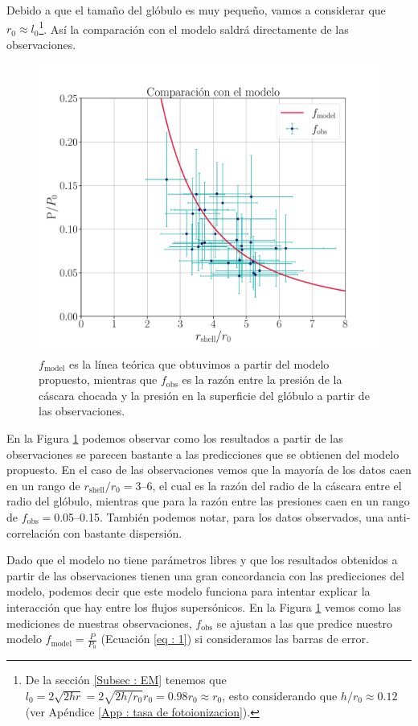 \documentclass{book}
\begin{document}
Debido a que el tamaño del glóbulo es muy pequeño, vamos a considerar
que $r_0\approx l_0$\footnote{De la sección \ref{Subsec : EM} tenemos que
  $l_0=2\sqrt{2hr}=2\sqrt{2h/r_0}r_0=0.98 r_0\approx r_0$, esto considerando
  que $h/r_0\approx0.12$ (ver Apéndice \ref{App : tasa de
    fotoionizacion}).}. Así la comparación con el modelo saldrá
directamente de las observaciones.

\begin{figure}[htb]
    \centering
    \includegraphics[width=\textwidth]{imagenes_corregidas/Model.pdf}
    \caption{$f_\mathrm{model}$ es la línea teórica que obtuvimos a partir del modelo propuesto, mientras que $f_\mathrm{obs}$ es la razón entre la presión de la cáscara chocada  y la presión en la superficie del glóbulo a partir de las observaciones.}
    \label{Resultados_modelo}
\end{figure}

En la Figura \ref{Resultados_modelo} podemos observar como los
resultados a partir de las observaciones se parecen bastante a las
predicciones que se obtienen del modelo propuesto. En el caso de las
observaciones vemos que la mayoría de los datos caen en un rango de
$r_\mathrm{shell}/r_0=$3--6, el cual es la razón del radio de la
cáscara entre el radio del glóbulo, mientras que para la razón entre
las presiones caen en un rango de $f_\mathrm{obs}=$0.05--0.15. También
podemos notar, para los datos observados, una anti-correlación con
bastante dispersión.

Dado que el modelo no tiene parámetros libres y que los resultados
obtenidos a partir de las observaciones tienen una gran concordancia
con las predicciones del modelo, podemos decir que este modelo
funciona para intentar explicar la interacción que hay entre los
flujos supersónicos. En la Figura \ref{Resultados_modelo} vemos como
las mediciones de nuestras observaciones, $f_\mathrm{obs}$ se ajustan
a las que predice nuestro modelo $f_\mathrm{model}=\frac{P}{P_0}$
(Ecuación \ref{eq : 1}) si consideramos las barras de error.
\end{document}

